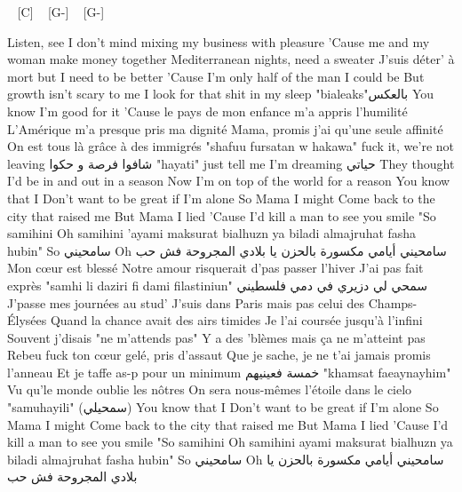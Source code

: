 
\begin{guitar}
[D-] ~ [C] ~ [G-] ~ [G-]

Listen, see I don't mind mixing my business with pleasure
'Cause me and my woman make money together
Mediterranean nights, need a sweater
J'suis déter' à mort but I need to be better
'Cause I'm only half of the man I could be
But growth isn't scary to me
I look for that shit in my sleep "bialeaks"بالعكس
You know I'm good for it
'Cause le pays de mon enfance m'a appris l'humilité
L'Amérique m'a presque pris ma dignité
Mama, promis j'ai qu'une seule affinité
On est tous là grâce à des immigrés
"shafuu fursatan w hakawa" fuck it, we're not leaving شافوا فرصة و حكوا
"hayati" just tell me I'm dreaming  حياتي
They thought I'd be in and out in a season
Now I'm on top of the world for a reason
You know that I
Don't want to be great if I'm alone
So Mama I might
Come back to the city that raised me
But Mama I lied
'Cause I'd kill a man to see you smile
"So samihini
Oh samihini
'ayami maksurat bialhuzn
ya biladi almajruhat fasha hubin"
So سامحيني
Oh سامحيني
أيامي مكسورة بالحزن
يا بلادي المجروحة فش حب
Mon cœur est blessé
Notre amour risquerait d'pas passer l'hiver
J'ai pas fait exprès "samhi li
daziri fi dami filastiniun" سمحي لي
دزيري في دمي فلسطيني
J'passe mes journées au stud'
J'suis dans Paris mais pas celui des Champs-Élysées
Quand la chance avait des airs timides
Je l'ai coursée jusqu'à l'infini
Souvent j'disais "ne m'attends pas"
Y a des 'blèmes mais ça ne m'atteint pas
Rebeu fuck ton cœur gelé, pris d'assaut
Que je sache, je ne t'ai jamais promis l'anneau
Et je taffe as-p pour un minimum
خمسة فعينيهم
"khamsat faeaynayhim"
Vu qu'le monde oublie les nôtres
On sera nous-mêmes l'étoile dans le cielo "samuhayili" (سمحيلي)
You know that I
Don't want to be great if I'm alone
So Mama I might
Come back to the city that raised me
But Mama I lied
'Cause I'd kill a man to see you smile
"So samihini
Oh samihini
ayami maksurat bialhuzn
ya biladi almajruhat fasha hubin"
So سامحيني
Oh سامحيني
أيامي مكسورة بالحزن
يا بلادي المجروحة فش حب
\end{guitar}